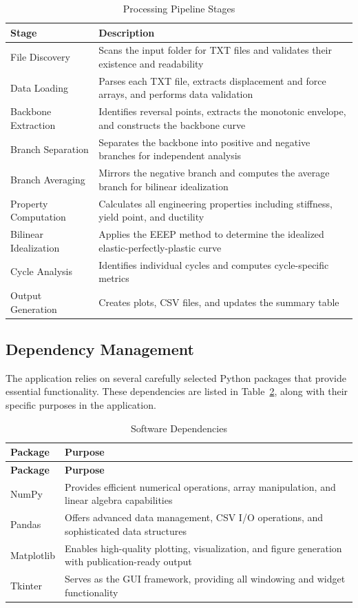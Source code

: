 \documentclass[11pt,a4paper]{article}
\begin{document}
\begin{table}[h]
\centering
\caption{Processing Pipeline Stages}\label{tab:pipeline_stages}
\begin{tabular}{p{3cm}p{11cm}}
\toprule
\textbf{Stage} & \textbf{Description} \\
\midrule
File Discovery & Scans the input folder for TXT files and validates their existence and readability \\
Data Loading & Parses each TXT file, extracts displacement and force arrays, and performs data validation \\
Backbone Extraction & Identifies reversal points, extracts the monotonic envelope, and constructs the backbone curve \\
Branch Separation & Separates the backbone into positive and negative branches for independent analysis \\
Branch Averaging & Mirrors the negative branch and computes the average branch for bilinear idealization \\
Property Computation & Calculates all engineering properties including stiffness, yield point, and ductility \\
Bilinear Idealization & Applies the EEEP method to determine the idealized elastic-perfectly-plastic curve \\
Cycle Analysis & Identifies individual cycles and computes cycle-specific metrics \\
Output Generation & Creates plots, CSV files, and updates the summary table \\
\bottomrule
\end{tabular}
\end{table}

\subsection{Dependency Management}

The application relies on several carefully selected Python packages that provide essential functionality. These dependencies are listed in Table~\ref{tab:dependencies}, along with their specific purposes in the application.

\begin{longtable}{p{4cm}p{10cm}}
\caption{Software Dependencies}\label{tab:dependencies}\\
\toprule
\textbf{Package} & \textbf{Purpose} \\
\midrule
\endfirsthead
\toprule
\textbf{Package} & \textbf{Purpose} \\
\midrule
\endhead
NumPy & Provides efficient numerical operations, array manipulation, and linear algebra capabilities \\
Pandas & Offers advanced data management, CSV I/O operations, and sophisticated data structures \\
Matplotlib & Enables high-quality plotting, visualization, and figure generation with publication-ready output \\
Tkinter & Serves as the GUI framework, providing all windowing and widget functionality \\
\bottomrule
\end{longtable}
\end{document}
